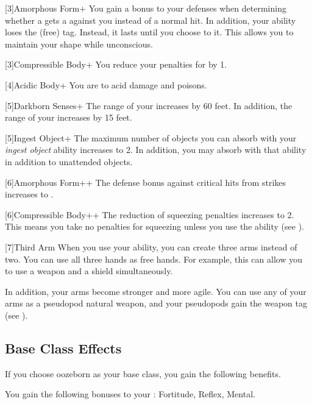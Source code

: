         [3]{Amorphous Form+} You gain a  bonus to your defenses when determining whether a  gets a  against you instead of a normal hit.
        In addition, your  ability loses the  (free) tag.
        Instead, it lasts until you choose to  it.
        This allows you to maintain your shape while unconscious.

        [3]{Compressible Body+} You reduce your penalties for \squeezing by 1.

        [4]{Acidic Body+} You are  to acid damage and poisons.

        [5]{Darkborn Senses+} The range of your  increases by 60 feet.
        In addition, the range of your  increases by 15 feet.

        [5]{Ingest Object+} The maximum number of objects you can absorb with your \textit{ingest object} ability increases to 2.
        In addition, you may absorb  with that ability in addition to unattended objects.

        [6]{Amorphous Form++} The defense bonus against critical hits from strikes increases to .

        [6]{Compressible Body++} The reduction of squeezing penalties increases to 2.
        This means you take no penalties for squeezing unless you use the  ability (see ).

        [7]{Third Arm} When you use your  ability, you can create three arms instead of two.
        You can use all three hands as free hands.
        For example, this can allow you to use a  weapon and a shield simultaneously.

        In addition, your arms become stronger and more agile.
        You can use any of your arms as a pseudopod natural weapon, and your pseudopods gain the  weapon tag (see ).

    \subsection{Base Class Effects}
        If you choose oozeborn as your base class, you gain the following benefits.

        You gain the following bonuses to your :  Fortitude,  Reflex,  Mental.

